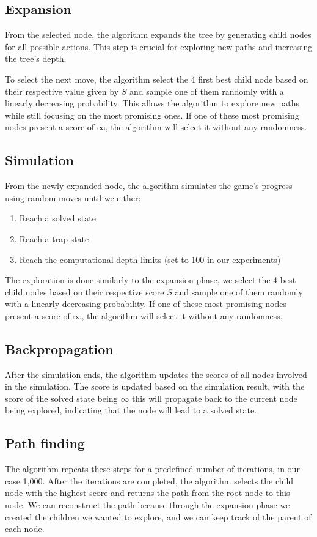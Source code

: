 \subsection{Expansion}
From the selected node, the algorithm expands the tree by generating child nodes for all possible actions. This step is crucial for exploring new paths and increasing the tree's depth.

To select the next move, the algorithm select the 4 first best child node based on their respective value given by $S$ and sample one of them randomly with a linearly decreasing probability. This allows the algorithm to explore new paths while still focusing on the most promising ones. If one of these most promising nodes present a score of $\infty$, the algorithm will select it without any randomness.

\subsection{Simulation}
From the newly expanded node, the algorithm simulates the game's progress using random moves until we either:
\begin{enumerate}
    \item Reach a solved state
    \item Reach a trap state
    \item Reach the computational depth limits (set to 100 in our experiments)
\end{enumerate}
The exploration is done similarly to the expansion phase, we select the 4 best child nodes based on their respective score $S$ and sample one of them randomly with a linearly decreasing probability. If one of these most promising nodes present a score of $\infty$, the algorithm will select it without any randomness.

\subsection{Backpropagation}
After the simulation ends, the algorithm updates the scores of all nodes involved in the simulation. The score is updated based on the simulation result, with the score of the solved state being $\infty$ this will propagate back to the current node being explored, indicating that the node will lead to a solved state.

\subsection{Path finding}
The algorithm repeats these steps for a predefined number of iterations, in our case 1,000. After the iterations are completed, the algorithm selects the child node with the highest score and returns the path from the root node to this node. We can reconstruct the path because through the expansion phase we created the children we wanted to explore, and we can keep track of the parent of each node.

